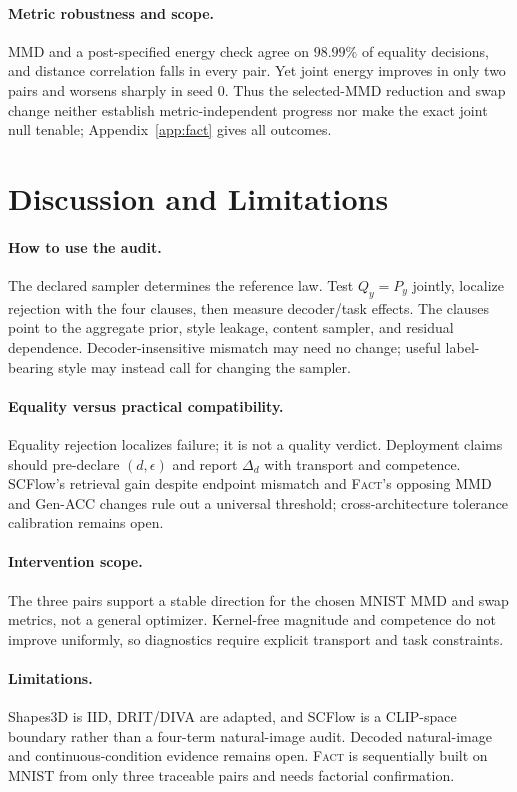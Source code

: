 \documentclass{article}
\newcommand{\FACT}{\textsc{Fact}}
\begin{document}
\paragraph{Metric robustness and scope.}
MMD and a post-specified energy check agree on $98.99\%$ of equality decisions,
and distance correlation falls in every pair.  Yet joint energy improves in
only two pairs and worsens sharply in seed 0.  Thus the selected-MMD reduction
and swap change neither establish metric-independent progress nor make the
exact joint null tenable; Appendix~\ref{app:fact} gives all outcomes.

\section{Discussion and Limitations}
\label{sec:discussion}

\paragraph{How to use the audit.}
The declared sampler determines the reference law.  Test $Q_y=P_y$ jointly,
localize rejection with the four clauses, then measure decoder/task effects.
The clauses point to the aggregate prior, style leakage, content sampler, and
residual dependence.  Decoder-insensitive mismatch may need no change; useful
label-bearing style may instead call for changing the sampler.

\paragraph{Equality versus practical compatibility.}
Equality rejection localizes failure; it is not a quality verdict.  Deployment
claims should pre-declare $(d,\epsilon)$ and report $\Delta_d$ with transport
and competence.  SCFlow's retrieval gain despite endpoint mismatch and
\FACT{}'s opposing MMD and Gen-ACC changes rule out a universal threshold;
cross-architecture tolerance calibration remains open.

\paragraph{Intervention scope.}
The three pairs support a stable direction for the chosen MNIST MMD and swap
metrics, not a general optimizer.  Kernel-free magnitude and competence do not
improve uniformly, so diagnostics require explicit transport and task constraints.

\paragraph{Limitations.}
Shapes3D is IID, DRIT/DIVA are adapted, and SCFlow is a CLIP-space boundary
rather than a four-term natural-image audit.  Decoded natural-image and
continuous-condition evidence remains open.  \FACT{} is sequentially built on
MNIST from only three traceable pairs and needs factorial confirmation.
\end{document}

